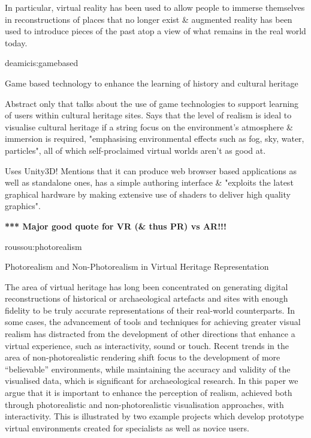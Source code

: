 In particular, virtual reality has been used to allow people to immerse themselves in reconstructions of places that no longer exist \& augmented reality has been used to introduce pieces of the past atop a view of what remains in the real world today.


deamicis:gamebased

Game based technology to enhance the learning of history and cultural heritage

Abstract only that talks about the use of game technologies to support learning of users
within cultural heritage sites. Says that the level of realism is ideal to visualise cultural
heritage if a string focus on the environment's atmosphere & immersion is required, "emphasising
environmental effects such as fog, sky, water, particles", all of which self-proclaimed virtual
worlds aren't as good at.
        
Uses Unity3D! Mentions that it can produce web browser based applications as well as standalone
ones, has a simple authoring interface & "exploits the latest graphical hardware by making extensive
use of shaders to deliver high quality graphics".

\textbf{*** Major good quote for VR (\& thus PR) vs AR!!!}


roussou:photorealism

Photorealism and Non-Photorealism
in Virtual Heritage Representation

The area of virtual heritage has long been concentrated on generating digital reconstructions of historical or
archaeological artefacts and sites with enough fidelity to be truly accurate representations of their real-world
counterparts. In some cases, the advancement of tools and techniques for achieving greater visual realism has
distracted from the development of other directions that enhance a virtual experience, such as interactivity, sound
or touch. Recent trends in the area of non-photorealistic rendering shift focus to the development of more “believable”
environments, while maintaining the accuracy and validity of the visualised data, which is significant for
archaeological research. In this paper we argue that it is important to enhance the perception of realism, achieved
both through photorealistic and non-photorealistic visualisation approaches, with interactivity. This is illustrated
by two example projects which develop prototype virtual environments created for specialists as well as novice
users.

